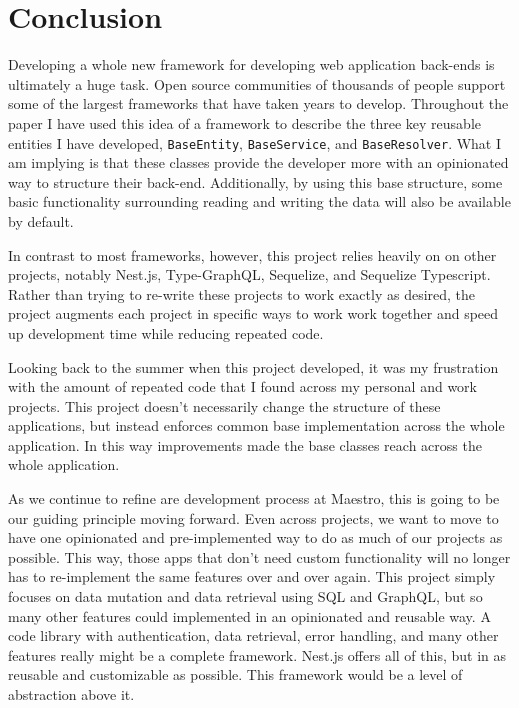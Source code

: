 \section{Conclusion}

Developing a whole new framework for developing web application back-ends is ultimately a huge task.  Open source communities of thousands of people support some of the largest frameworks that have taken years to develop. Throughout the paper I have used this idea of a framework to describe the three key reusable entities I have developed, \verb!BaseEntity!, \verb!BaseService!, and \verb!BaseResolver!.  What I am implying is that these classes provide the developer more with an opinionated way to structure their back-end.  Additionally, by using this base structure, some basic functionality surrounding reading and writing the data will also be available by default.

In contrast to most frameworks, however, this project relies heavily on on other projects, notably Nest.js, Type-GraphQL, Sequelize, and Sequelize Typescript.  Rather than trying to re-write these projects to work exactly as desired, the project augments each project in specific ways to work work together and speed up development time while reducing repeated code.

Looking back to the summer when this project developed, it was my frustration with the amount of repeated code that I found across my personal and work projects.  This project doesn't necessarily change the structure of these applications, but instead enforces common base implementation across the whole application. In this way improvements made the base classes reach across the whole application.

As we continue to refine are development process at Maestro, this is going to be our guiding principle moving forward.  Even across projects, we want to move to have one opinionated and pre-implemented way to do as much of our projects as possible.  This way, those apps that don't need custom functionality will no longer has to re-implement the same features over and over again.  This project simply focuses on data mutation and data retrieval using SQL and GraphQL, but so many other features could implemented in an opinionated and reusable way.  A code library with authentication, data retrieval, error handling, and many other features really might be a complete framework.  Nest.js offers all of this, but in as reusable and customizable as possible.  This framework would be a level of abstraction above it.